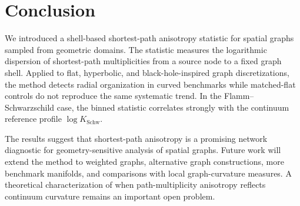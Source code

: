 \documentclass{svproc}
\begin{document}
\section{Conclusion}

We introduced a shell-based shortest-path anisotropy statistic for spatial graphs sampled from geometric domains. The statistic measures the logarithmic dispersion of shortest-path multiplicities from a source node to a fixed graph shell. Applied to flat, hyperbolic, and black-hole-inspired graph discretizations, the method detects radial organization in curved benchmarks while matched-flat controls do not reproduce the same systematic trend. In the Flamm--Schwarzschild case, the binned statistic correlates strongly with the continuum reference profile $\log K_{\mathrm{Schw}}$.

The results suggest that shortest-path anisotropy is a promising network diagnostic for geometry-sensitive analysis of spatial graphs. Future work will extend the method to weighted graphs, alternative graph constructions, more benchmark manifolds, and comparisons with local graph-curvature measures. A theoretical characterization of when path-multiplicity anisotropy reflects continuum curvature remains an important open problem.
\end{document}

